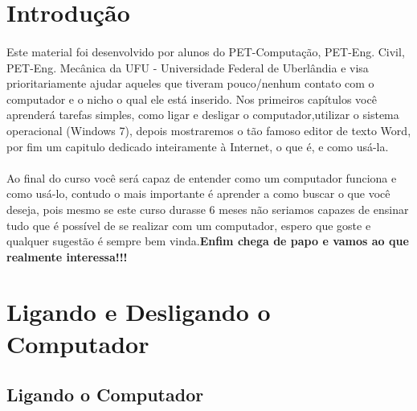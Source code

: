 \documentclass[hidelinks,12pt]{article}
\begin{document}
\pagestyle{fancy}
	
\tableofcontents
{\let\thefootnote\relax{}}

{\let\thefootnote\relax{}}

\newpage

\section{Introdução}
\paragraph{} Este material foi desenvolvido por alunos do PET-Computação, PET-Eng. Civil, PET-Eng. Mecânica da UFU - Universidade Federal de Uberlândia e visa prioritariamente ajudar aqueles que tiveram pouco/nenhum contato com o computador e o nicho o qual ele
			está inserido. Nos primeiros capítulos você aprenderá tarefas simples, como ligar e desligar o computador,utilizar o sistema operacional (Windows 7), depois mostraremos o tão famoso editor de texto Word, por fim um capitulo dedicado inteiramente à Internet, o que é, e como usá-la.
\paragraph{} Ao final do curso você será capaz de entender como um computador funciona e como usá-lo, contudo o mais importante
			é aprender a como buscar o que você deseja, pois mesmo se este curso durasse 6 meses não seriamos capazes 
			de ensinar tudo que é possível de se realizar com um computador, espero que goste e qualquer sugestão é sempre bem vinda.\textbf{Enfim chega de papo e vamos ao que realmente interessa!!!}

\section{Ligando e Desligando o Computador}
\subsection{Ligando o Computador} 
\end{document}
